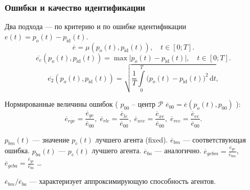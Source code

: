 \documentclass[10pt,utf8]{beamer}
\begin{document}
\begin{frame}
  \frametitle{Ошибки и качество идентификации}

  Два подхода --- по критерию и по ошибке идентификации $e(t)=p_o(t)-p_\mathrm{id}(t)$.
  \[
    \overline{e} = \mu( p_o(t), p_\mathrm{id}(t) ),
    \quad
    t \in [0;T].
  \]
  \begin{equation}
    \overline{e_c}(p_o(t),p_\mathrm{id}(t))
    =
    \max \big| p_o(t)-p_\mathrm{id}(t) \big|,
    \quad
    t \in [0;T].
    \label{atu:eq:e_c}
  \end{equation}
  \begin{equation}
    \overline{e_2}(p_o(t),p_\mathrm{id}(t))
    =
    \sqrt{ \frac{1}{T} \int\limits_{0}^{T} \big( p_o(t)-p_\mathrm{id}(t) \big)^2 \, \mathrm{d}t },
    \label{atu:eq:e_2}
  \end{equation}

  Нормированные величины ошибок ( $p_{00}$ -- центр $\mathcal{P}$
  $ \overline{e}_{00}  = \overline{e}(p_o(t),p_{00})$ ):
  \begin{equation}
    \overline{e}_{rge} = \frac{\overline{e}_{ge}}{\overline{e}_{00}}, \;
    \overline{e}_{rle} = \frac{\overline{e}_{le}}{\overline{e}_{00}}, \;
    \overline{e}_{xee} = \frac{\overline{e}_{xe}}{\overline{e}_{00}}, \;
    \overline{e}_{ree} = \frac{\overline{e}_{ee}}{\overline{e}_{00}}.
    \label{atu:eq:e_rxx}
  \end{equation}

  $p_{bm}(t)$ --- значение $p_c(t)$ лучшего агента (fixed).
  $\overline{e}_{bm}$ --- соответствующая ошибка.
  $p_{ba}(t)$ --- $p_e(t)$ лучшего агента.
  $\overline{e}_{ba}$ --- аналогично.
  $\overline{e}_{gebm} = \frac{\overline{e}_{ge}}{\overline{e}_{bm}}$,
  $\overline{e}_{geba} = \frac{\overline{e}_{ge}}{\overline{e}_{ba}}$ \ldots

 $\overline{e}_{bm} / \overline{e}_{ba}$ ---
 характеризует аппроксимирующую способность агентов.

\end{frame}





\end{document}
